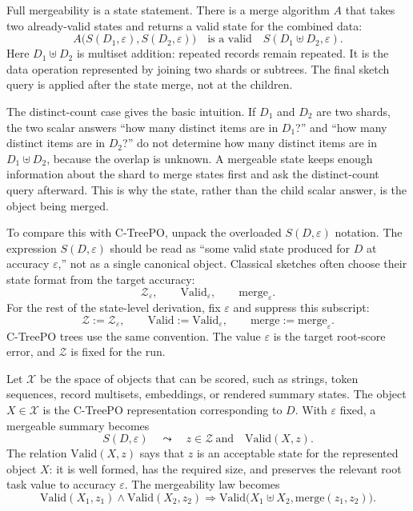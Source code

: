 Full mergeability is a state statement.  There is a merge algorithm \(A\) that
takes two already-valid states and returns a valid state for the combined
data:
\[
  A\big(S(D_1,\varepsilon),S(D_2,\varepsilon)\big)
  \quad\text{is a valid}\quad
  S(D_1\uplus D_2,\varepsilon).
\]
Here \(D_1\uplus D_2\) is multiset addition: repeated records remain repeated.
It is the data operation represented by joining two shards or subtrees.  The
final sketch query is applied after the state merge, not at the children.

The distinct-count case gives the basic intuition.  If \(D_1\) and \(D_2\)
are two shards, the two scalar answers ``how many distinct items are in
\(D_1\)?'' and ``how many distinct items are in \(D_2\)?'' do not determine
how many distinct items are in \(D_1\uplus D_2\), because the overlap is
unknown.  A mergeable state keeps enough information about the shard to merge
states first and ask the distinct-count query afterward.  This is why the
state, rather than the child scalar answer, is the object being merged.

To compare this with C-TreePO, unpack the overloaded
\(S(D,\varepsilon)\) notation.  The expression \(S(D,\varepsilon)\) should be
read as ``some valid state produced for \(D\) at accuracy
\(\varepsilon\),'' not as a single canonical object.  Classical sketches
often choose their state format from the target accuracy:
\[
  \mathcal{Z}_\varepsilon,\qquad
  \mathrm{Valid}_\varepsilon,\qquad
  \mathrm{merge}_\varepsilon.
\]
For the rest of the state-level derivation, fix \(\varepsilon\) and suppress
this subscript:
\[
  \mathcal{Z}:=\mathcal{Z}_\varepsilon,\qquad
  \mathrm{Valid}:=\mathrm{Valid}_\varepsilon,\qquad
  \mathrm{merge}:=\mathrm{merge}_\varepsilon.
\]
C-TreePO trees use the same convention.  The value \(\varepsilon\) is the
target root-score error, and \(\mathcal{Z}\) is fixed for the run.

Let \(\mathcal{X}\) be the space of objects that can be scored, such as
strings, token sequences, record multisets, embeddings, or rendered summary
states.  The object \(X\in\mathcal{X}\) is the C-TreePO representation
corresponding to \(D\).  With \(\varepsilon\) fixed, a mergeable summary becomes
\[
  S(D,\varepsilon)
  \quad\leadsto\quad
  z\in\mathcal{Z}
  \ \text{and}\quad
  \mathrm{Valid}(X,z).
\]
The relation \(\mathrm{Valid}(X,z)\) says that \(z\) is an acceptable state
for the represented object \(X\): it is well formed, has the required size,
and preserves the relevant root task value to accuracy \(\varepsilon\).
The mergeability law becomes
\[
  \mathrm{Valid}(X_1,z_1)
  \wedge
  \mathrm{Valid}(X_2,z_2)
  \Longrightarrow
  \mathrm{Valid}
  \big(X_1\uplus X_2,\mathrm{merge}(z_1,z_2)\big).
\]

